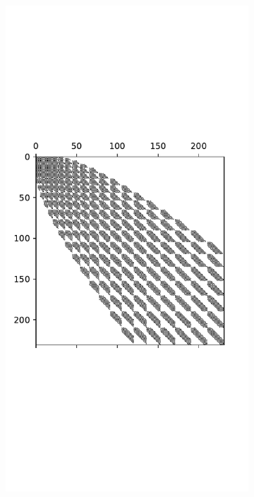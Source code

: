 \documentclass[11pt, oneside]{article}   	%
\begin{document}
\begin{figure}[t]
	\begin{subfigure}{0.32\textwidth}
	\includegraphics[scale=0.35]{sparsityofhelmholtz-diskslice-alpha=0p2-beta=0p8}
        \centering
	\end{subfigure}
	\begin{subfigure}{0.32\textwidth}

\end{subfigure}
\end{figure}
\end{document}
